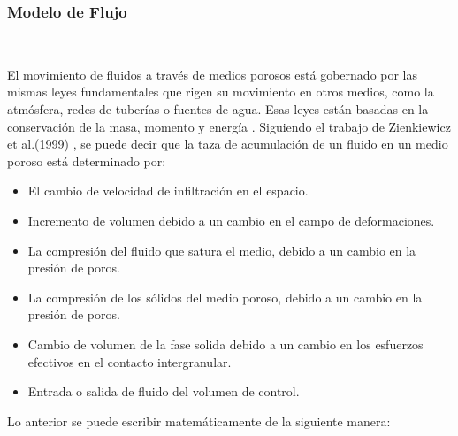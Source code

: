 \subsubsection{Modelo de Flujo}~\hypertarget{sec:sec3312}{}
\label{sec:sec3312}


El movimiento de fluidos a través de medios porosos está gobernado por las mismas leyes fundamentales que rigen su movimiento en otros medios, como la atmósfera, redes de tuberías o fuentes de agua. Esas leyes están basadas en la conservación de la masa, momento y energía \cite{Aziz1979PetroleumSimulation}. Siguiendo el trabajo de Zienkiewicz et al.(1999) \cite{Zienkiewicz1999ComputationalGeomechanics}, se puede decir que la taza de acumulación de un fluido en un medio poroso está determinado por:

\begin{itemize}
    \item El cambio de velocidad de infiltración en el espacio.
    \item Incremento de volumen debido a un cambio en el campo de deformaciones.
    \item La compresión del fluido que satura el medio, debido a un cambio en la presión de poros.
    \item La compresión de los sólidos del medio poroso, debido a un cambio en la presión de poros.
    \item Cambio de volumen de la fase solida debido a un cambio en los esfuerzos efectivos en el contacto intergranular.
    \item Entrada o salida de fluido del volumen de control.
\end{itemize}

Lo anterior se puede escribir matemáticamente de la siguiente manera:

